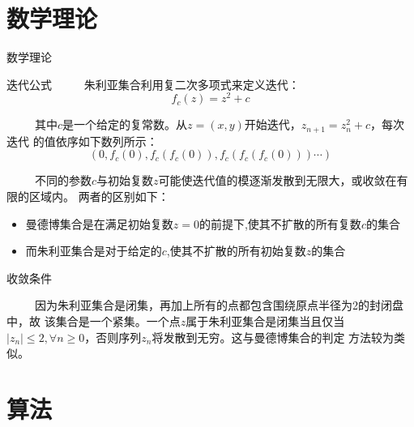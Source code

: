 \documentclass[8pt,c,compress,UTF8]{beamer}
\begin{document}
\section{数学理论}
\begin{frame}{数学理论}
\begin{exampleblock}{迭代公式}
\ \ \ \ \ 朱利亚集合利用复二次多项式\cite{complexanalysis}来定义迭代：
$$f_c(z)=z^2+c$$
\par 
\ \ \ \ \ 其中$c$是一个给定的复常数。从$z=(x,y)$开始迭代，$z_{n+1}=z^2_n+c$，每次迭代
的值依序如下数列所示：
$$(0,f_c(0),f_c(f_c(0)),f_c(f_c(f_c(0)))\cdots)$$
\par
\ \ \ \ \ 不同的参数$c$与初始复数$z$可能使迭代值的模逐渐发散到无限大，或收敛在有限的区域内。
两者的区别如下：
\begin{itemize}
    \setlength{\itemsep}{1pt}
    \item 曼德博集合是在满足初始复数$z=0$的前提下,使其不扩散的所有复数$c$的集合
    \item 而朱利亚集合是对于给定的$c$,使其不扩散的所有初始复数$z$的集合
\end{itemize}

\end{exampleblock}


\begin{exampleblock}{收敛条件}
\par 
\ \ \ \ \ 因为朱利亚集合是闭集，再加上所有的点都包含围绕原点半径为2的封闭盘中，故
该集合是一个紧集。一个点$z$属于朱利亚集合是闭集当且仅当
$|z_n|\leq 2,\forall n\geq 0$，否则序列$z_n$将发散到无穷。这与曼德博集合的判定
方法较为类似。
\end{exampleblock}
\end{frame}

\section{算法}
\end{document}
